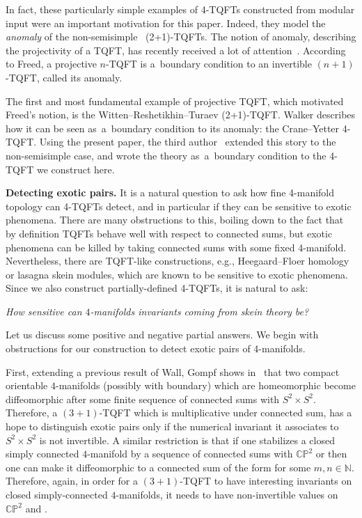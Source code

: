 \documentclass[10pt,a4paper]{amsart}
\numberwithin{equation}{section}
\numberwithin{theorem}{section}
\numberwithin{proposition}{section}
\numberwithin{definition}{section}
\numberwithin{lemma}{section}
\numberwithin{corollary}{section}
\numberwithin{remark}{section}
\numberwithin{example}{section}
\newcommand{\N}{\ensuremath{\mathbb{N}}}
\newcommand{\CP}{\mathbb{CP}}
\newcounter{exo} \newcounter{numexercice}
\begin{document}
In fact, these particularly simple examples of 4-TQFTs constructed from modular input were an important motivation for this paper. Indeed, they model the \emph{anomaly} of the non-semisimple~\cite{DRGGPMR2022} (2+1)-TQFTs. The notion of anomaly, describing the projectivity of a TQFT,
has
recently received a lot of attention~\cite{FreedAnomalyInvFT, FreedAnomaly}. According to Freed, a projective $n$-TQFT is a~boundary condition to an invertible $(n+1)$-TQFT, called its anomaly.

The first and most fundamental example of projective TQFT, which motivated Freed's notion, is the Witten--Reshetikhin--Turaev (2+1)-TQFT. Walker describes how it can be seen as~a~boundary condition to its anomaly: the Crane--Yetter 4-TQFT. Using the present paper, the third author~\cite{HaiounWRT} extended this story to the non-semisimple case, and wrote \cite{DRGGPMR2022} the theory as~a~boundary condition to the 4-TQFT we construct here.

\textbf{Detecting exotic pairs.}
It is a natural question to ask how fine 4-manifold topology can 4-TQFTs detect, and in particular if they can be sensitive to exotic phenomena. There are many obstructions to this, boiling down to the fact that by
definition TQFTs behave well with respect to connected sums,
but exotic phenomena can be killed by taking connected sums with some fixed 4-manifold. Nevertheless, there are TQFT-like constructions, e.g., Heegaard--Floer homology or lasagna skein modules, which are known to be sensitive to exotic phenomena. Since we also construct partially-defined 4-TQFTs, it is natural to ask:
\begin{center}
 \it How sensitive can $4$-manifolds invariants coming from skein theory be?
\end{center}
Let us discuss some positive and negative partial answers. We begin with obstructions for our construction to detect exotic pairs of 4-manifolds.

First, extending a previous result of Wall,
Gompf shows in~\cite{Go}
that two compact orientable $4$-manifolds (possibly with boundary) which are homeomorphic become diffeomorphic after some finite sequence of connected sums with $S^2\times S^2$. Therefore, a $(3+1)$-TQFT which is multiplicative under connected sum, has a hope to distinguish exotic pairs only if the numerical invariant it associates to $S^2\times S^2$ is not invertible.
A similar restriction is that if one stabilizes a closed simply connected $4$-manifold by a sequence of connected sums with $\CP^2$ or \smash{$\overline{\CP^2}$} then one can make it diffeomorphic to a connected sum of the form \smash{$\#_m\CP^2\#_n\overline{\CP^2}$} for some $m,n\in \N$. Therefore, again, in order for a $(3+1)$-TQFT to have interesting invariants on closed simply-connected $4$-manifolds, it needs to have non-invertible values on $\CP^2$ and \smash{$\overline{\CP^2}$}.
\end{document}
